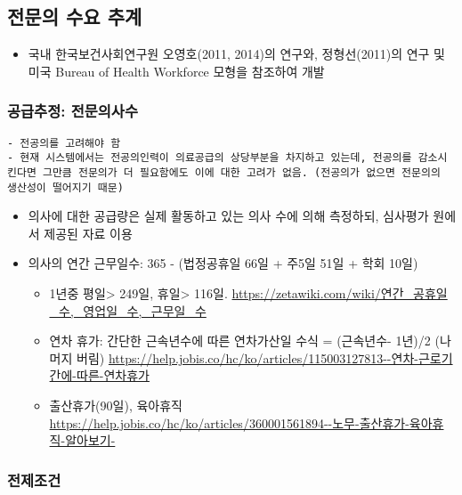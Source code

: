 \documentclass[]{book}
\providecommand{\tightlist}{%
  \setlength{\itemsep}{0pt}\setlength{\parskip}{0pt}}
\begin{document}
\hypertarget{section-5}{%
\subsection{전문의 수요 추계}\label{section-5}}

\begin{itemize}
\tightlist
\item
  국내 한국보건사회연구원 오영호(2011, 2014)의 연구와, 정형선(2011)의 연구 및 미국 Bureau of Health Workforce 모형을 참조하여 개발
\end{itemize}

\hypertarget{section-6}{%
\subsubsection{공급추정: 전문의사수}\label{section-6}}

\begin{verbatim}
- 전공의를 고려해야 함
- 현재 시스템에서는 전공의인력이 의료공급의 상당부분을 차지하고 있는데, 전공의를 감소시킨다면 그만큼 전문의가 더 필요함에도 이에 대한 고려가 없음. (전공의가 없으면 전문의의 생산성이 떨어지기 때문)
\end{verbatim}

\begin{itemize}
\item
  의사에 대한 공급량은 실제 활동하고 있는 의사 수에 의해 측정하되, 심사평가 원에서 제공된 자료 이용
\item
  의사의 연간 근무일수: 365 - (법정공휴일 66일 + 주5일 51일 + 학회 10일)

  \begin{itemize}
  \tightlist
  \item
    1년중 평일\textgreater{} 249일, 휴일\textgreater{} 116일. \url{https://zetawiki.com/wiki/연간_공휴일_수,_영업일_수,_근무일_수}
  \item
    연차 휴가: 간단한 근속년수에 따른 연차가산일 수식 = (근속년수- 1년)/2 (나머지 버림) \url{https://help.jobis.co/hc/ko/articles/115003127813--연차-근로기간에-따른-연차휴가}
  \item
    출산휴가(90일), 육아휴직 \url{https://help.jobis.co/hc/ko/articles/360001561894--노무-출산휴가-육아휴직-알아보기-}
  \end{itemize}
\end{itemize}

\hypertarget{section-7}{%
\subsubsection{전제조건}\label{section-7}}
\end{document}
